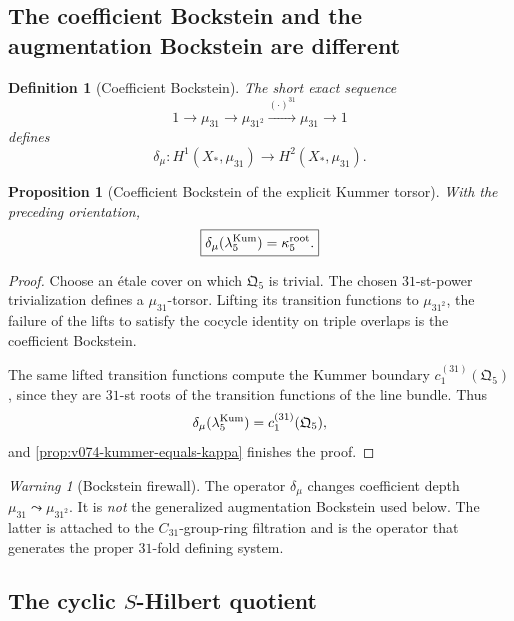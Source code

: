 \documentclass[11pt]{article}
\newtheorem{proposition}[theorem]{Proposition}
\newtheorem{definition}[theorem]{Definition}
\theoremstyle{remark}
\newtheorem{warning}[theorem]{Warning}
\begin{document}
\subsection{The coefficient Bockstein and the augmentation Bockstein are
different}

\begin{definition}[Coefficient Bockstein]
\label{def:v074-coeff-bockstein}
The short exact sequence
\[
 1\longrightarrow\mu_{31}
 \longrightarrow\mu_{31^2}
 \xrightarrow{(\cdot)^{31}}\mu_{31}
 \longrightarrow1
\]
defines
\[
 \delta_\mu:
 H^1(X_*,\mu_{31})
 \longrightarrow
 H^2(X_*,\mu_{31}).
\]
\end{definition}

\begin{proposition}[Coefficient Bockstein of the explicit Kummer torsor]
\label{prop:v074-coeff-bockstein}
With the preceding orientation,
\begin{equation}
 \boxed{
 \delta_\mu(\lambda_5^{\rm Kum})
 =
 \kappa_5^{\rm root}.}
 \label{eq:v074-coeff-bockstein}
\end{equation}
\end{proposition}

\begin{proof}
Choose an étale cover on which \(\mathfrak Q_5\) is trivial.
The chosen \(31\)-st-power trivialization defines a \(\mu_{31}\)-torsor.
Lifting its transition functions to \(\mu_{31^2}\), the failure of the
lifts to satisfy the cocycle identity on triple overlaps is the coefficient
Bockstein.

The same lifted transition functions compute the Kummer boundary
\(c_1^{(31)}(\mathfrak Q_5)\), since they are \(31\)-st roots of the
transition functions of the line bundle.  Thus
\[
 \delta_\mu(\lambda_5^{\rm Kum})
 =
 c_1^{(31)}(\mathfrak Q_5),
\]
and \cref{prop:v074-kummer-equals-kappa} finishes the proof.
\end{proof}

\begin{warning}[Bockstein firewall]
\label{warn:v074-two-bocksteins}
The operator \(\delta_\mu\) changes coefficient depth
\(\mu_{31}\leadsto\mu_{31^2}\).  It is \emph{not} the generalized
augmentation Bockstein used below.  The latter is attached to the
\(C_{31}\)-group-ring filtration and is the operator that generates the
proper \(31\)-fold defining system.
\end{warning}

\subsection{The cyclic \texorpdfstring{\(S\)}{S}-Hilbert quotient}
\end{document}
